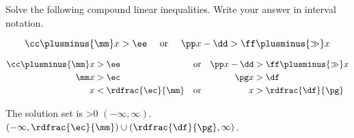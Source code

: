 





\pgfmathtruncatemacro{\ee}{\cc+\mm*\aa}
\pgfmathtruncatemacro{\ff}{\nn*\bb+\dd}
\pgfmathtruncatemacro{\gg}{\pp-\nn}

\pgfmathtruncatemacro{\ec}{\ee-\cc}
\pgfmathtruncatemacro{\pg}{\pp-\gg}
\pgfmathtruncatemacro{\df}{\dd+\ff}
\pgfmathtruncatemacro{\anschecker}{\ec/\mm-\df/\pg}


Solve the following compound linear inequalities. Write your answer in interval notation. 


\[ \cc \plusminus{\mm} x>\ee \quad \textup{  or  }\quad \pp x-\dd > \ff \plusminus{\gg} x \]

\begin{solution}
\begin{center}
\begin{align*}
\cc \plusminus{\mm} x&> \ee &&\text{or} & \pp x-\dd &> \ff \plusminus{\gg} x\\
\mm x&>\ec  &&  & \pg x&> \df\\
x&< \rdfrac{\ec}{\mm} &&\text{or}  &  x&> \rdfrac{\df}{\pg}
\end{align*}
\end{center}

The solution set is
\ifnum\anschecker>0
	 $(-\infty, \infty)$.
 \else
	 $(-\infty, \rdfrac{\ec}{\mm})\cup (\rdfrac{\df}{\pg}, \infty)$.
 \fi
\end{solution}
